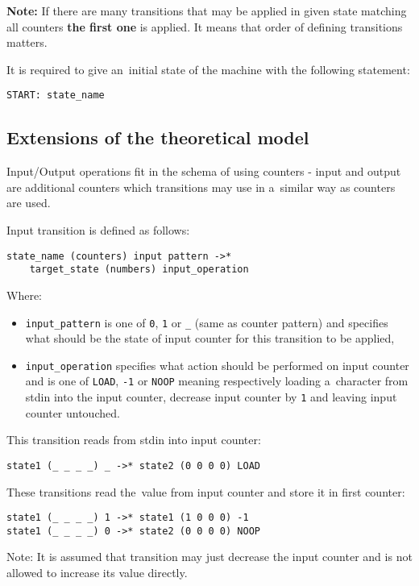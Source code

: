 \documentclass[english,shortabstract,mgr]{iithesis}
\begin{document}
\textbf{Note:} If there are many transitions that may be applied in given state
matching all counters \textbf{the first one} is applied. It means that order
of defining transitions matters.

It is required to give an~initial state of the machine with the following statement:
\begin{verbatim}
START: state_name
\end{verbatim}

\subsection {Extensions of the theoretical model}

Input/Output operations fit in the schema of using counters - input and output
are additional counters which transitions may use in a~similar way as counters are used.

Input transition is defined as follows:
\begin{verbatim}
state_name (counters) input pattern ->*
    target_state (numbers) input_operation
\end{verbatim}

Where:
\begin{itemize}
  \item \texttt{input\_pattern} is one of \texttt{0}, \texttt{1} or \texttt{\_}
      (same as counter pattern) and specifies what should be the state
      of input counter for this transition to be applied,
  \item \texttt{input\_operation} specifies what action should be performed
      on input counter and is one of \texttt{LOAD}, \texttt{-1} or \texttt{NOOP}
      meaning respectively loading a~character from stdin into the input counter,
      decrease input counter by \texttt{1} and leaving input counter untouched.
\end{itemize}

This transition reads from stdin into input counter:
\begin{verbatim}
state1 (_ _ _ _) _ ->* state2 (0 0 0 0) LOAD
\end{verbatim}

These transitions read the~value from input counter and store it in first counter:
\begin{verbatim}
state1 (_ _ _ _) 1 ->* state1 (1 0 0 0) -1
state1 (_ _ _ _) 0 ->* state2 (0 0 0 0) NOOP
\end{verbatim}

Note: It is assumed that transition may just decrease the input counter
and is not allowed to increase its value directly.
\end{document}
